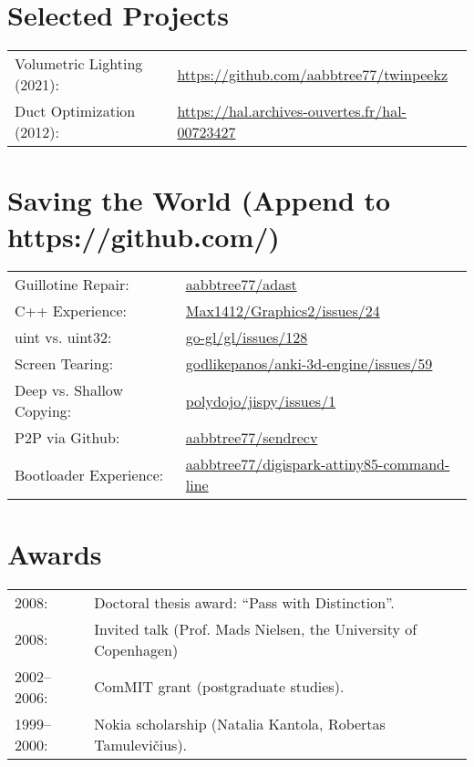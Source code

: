 \documentclass[a4paper,11pt]{article}
\begin{document}
\section*{Selected Projects}
\label{sect:pubs}

\begin{tabular}{ll}
Volumetric Lighting (2021): & \url{https://github.com/aabbtree77/twinpeekz} \\
Duct Optimization (2012):& \url{https://hal.archives-ouvertes.fr/hal-00723427}
\end{tabular}

%
\section*{Saving the World (Append to https://github.com/)}
\begin{tabular}{ll}
Guillotine Repair: & \url{aabbtree77/adast}\\
C++ Experience: & \url{Max1412/Graphics2/issues/24}\\
uint vs. uint32: & \url{go-gl/gl/issues/128}\\
Screen Tearing: & \url{godlikepanos/anki-3d-engine/issues/59}\\
Deep vs. Shallow Copying: & \url{polydojo/jispy/issues/1}\\
P2P via Github: & \url{aabbtree77/sendrecv}\\
Bootloader Experience: & \url{aabbtree77/digispark-attiny85-command-line}\\
\end{tabular}

%
%
\section*{Awards}
%
\begin{tabular}{ll}
        2008: & Doctoral thesis award: “Pass with Distinction”.\\
        2008: & Invited talk (Prof. Mads Nielsen, the University of Copenhagen)\\
        2002--2006:& ComMIT grant (postgraduate studies).\\
        1999--2000:& Nokia scholarship (Natalia Kantola, Robertas Tamulevi\v{c}ius).
\end{tabular}
%
%

\end{document}
